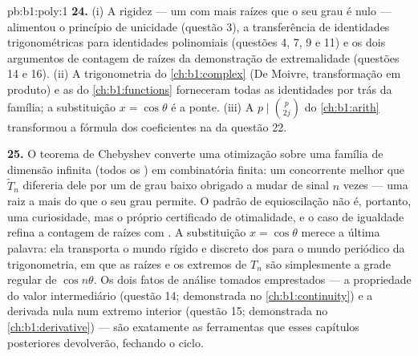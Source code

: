 \begin{solution}{pb:b1:poly:1}
\textbf{24.} (i) A rigidez --- um  com mais raízes que
o seu grau é nulo --- alimentou o princípio de unicidade
(questão 3), a transferência de identidades trigonométricas para
identidades polinomiais (questões 4, 7, 9 e 11) e os dois
argumentos de contagem de raízes da demonstração de extremalidade
(questões 14 e 16). (ii) A trigonometria do \cref{ch:b1:complex} (De Moivre,
transformação em produto) e as  do
\cref{ch:b1:functions} forneceram todas as identidades por trás da família;
a substituição $x = \cos\theta$ é a ponte. (iii) A
 $p \mid \binom p{2j}$ do \cref{ch:b1:arith} transformou
a fórmula dos coeficientes na  da questão 22.

\textbf{25.} O teorema de Chebyshev converte uma otimização sobre uma
família de dimensão infinita (todos os ) em
combinatória finita: um concorrente melhor que $\widetilde T_n$
difereria dele por um  de grau baixo obrigado a mudar de sinal
$n$ vezes --- uma raiz a mais do que o seu grau permite. O
padrão de equioscilação não é, portanto, uma curiosidade, mas o próprio
certificado de otimalidade, e o caso de igualdade refina a
contagem de raízes com . A substituição $x =
\cos\theta$ merece a última palavra: ela transporta o mundo rígido e
discreto dos  para o mundo periódico da
trigonometria, em que as raízes e os extremos de $T_n$ são simplesmente a
grade regular de $\cos n\theta$. Os dois fatos de análise tomados
emprestados --- a propriedade do valor intermediário (questão 14;
demonstrada no \cref{ch:b1:continuity}) e a derivada nula num
extremo interior (questão 15; demonstrada no \cref{ch:b1:derivative})
--- são exatamente as ferramentas que esses capítulos posteriores
devolverão, fechando o ciclo.
\end{solution}
